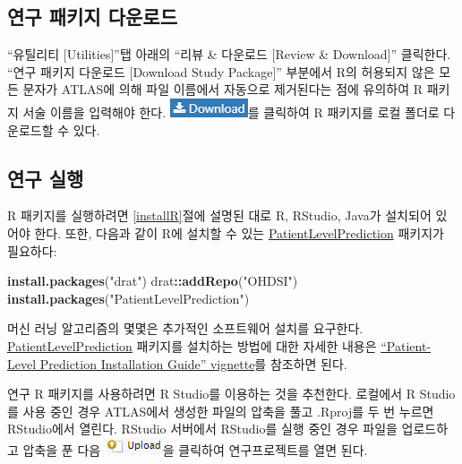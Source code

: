 \documentclass[11pt]{book}
\newenvironment{Shaded}{\begin{snugshade}}{\end{snugshade}}
\newcommand{\KeywordTok}[1]{\textcolor[rgb]{0.13,0.29,0.53}{\textbf{#1}}}
\newcommand{\StringTok}[1]{\textcolor[rgb]{0.31,0.60,0.02}{#1}}
\newcommand{\OperatorTok}[1]{\textcolor[rgb]{0.81,0.36,0.00}{\textbf{#1}}}
\newcommand{\NormalTok}[1]{#1}
\theoremstyle{definition}
\theoremstyle{definition}
\theoremstyle{definition}
\theoremstyle{remark}
\begin{document}
\subsection{연구 패키지 다운로드}\label{--}

``유틸리티 {[}Utilities{]}''탭 아래의 ``리뷰 \& 다운로드 {[}Review \&
Download{]}'' 클릭한다. ``연구 패키지 다운로드 {[}Download Study
Package{]}'' 부분에서 R의 허용되지 않은 모든 문자가 ATLAS에 의해 파일
이름에서 자동으로 제거된다는 점에 유의하여 R 패키지 서술 이름을 입력해야
한다. \includegraphics{images/PatientLevelPrediction/download.png}를
클릭하여 R 패키지를 로컬 폴더로 다운로드할 수 있다.

\subsection{연구 실행}\label{-}

R 패키지를 실행하려면 \ref{installR}절에 설명된 대로 R, RStudio, Java가
설치되어 있어야 한다. 또한, 다음과 같이 R에 설치할 수 있는
\href{https://ohdsi.github.io/PatientLevelPrediction/}{PatientLevelPrediction}
패키지가 필요하다:

\begin{Shaded}
\begin{Highlighting}[]
\KeywordTok{install.packages}\NormalTok{(}\StringTok{"drat"}\NormalTok{)}
\NormalTok{drat}\OperatorTok{::}\KeywordTok{addRepo}\NormalTok{(}\StringTok{"OHDSI"}\NormalTok{)}
\KeywordTok{install.packages}\NormalTok{(}\StringTok{"PatientLevelPrediction"}\NormalTok{)}
\end{Highlighting}
\end{Shaded}

머신 러닝 알고리즘의 몇몇은 추가적인 소프트웨어 설치를 요구한다.
\href{https://ohdsi.github.io/PatientLevelPrediction/}{PatientLevelPrediction}
패키지를 설치하는 방법에 대한 자세한 내용은
\href{https://ohdsi.github.io/PatientLevelPrediction/articles/InstallationGuide.html}{``Patient-Level
Prediction Installation Guide'' vignette}를 참조하면 된다.

연구 R 패키지를 사용하려면 R Studio를 이용하는 것을 추천한다. 로컬에서 R
Studio를 사용 중인 경우 ATLAS에서 생성한 파일의 압축을 풀고 .Rproj를 두
번 누르면 RStudio에서 열린다. RStudio 서버에서 RStudio를 실행 중인 경우
파일을 업로드하고 압축을 푼 다음
\includegraphics{images/PopulationLevelEstimation/upload.png}을 클릭하여
연구프로젝트를 열면 된다.
\end{document}
